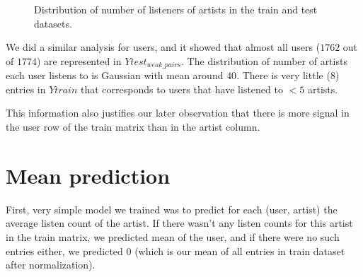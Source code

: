 \documentclass{report}
\begin{document}
\begin{figure}[!h]
\center
{}
\label{fig:artistListeners}
\hfill
\caption{Distribution of number of listeners of artists in the train and test datasets.}
\end{figure}

We did a similar analysis for users, and it showed that almost all users ($1762$ out of $1774$) are represented in $Ytest_{weak\_pairs}$. The distribution of number of artists each user listens to is Gaussian with mean around $40$. There is very little ($8$) entries in $Ytrain$ that corresponds to users that have listened to $< 5$ artists.

This information also justifies our later observation that there is more signal in the user row of the train matrix than in the artist column.

\section{Mean prediction}
First, very simple model we trained was to predict for each (user, artist) the average listen count of the artist. If there wasn't any listen counts for this artist in the train matrix, we predicted mean of the user, and if there were no such entries either, we predicted $0$ (which is our mean of all entries in train dataset after normalization).
\end{document}
